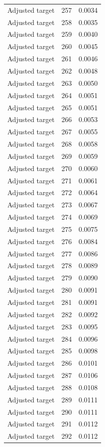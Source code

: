 \begin{table}[htbp]
\begin{tabular}{lll}
Adjusted target & 257 & 0.0034 \\
Adjusted target & 258 & 0.0035 \\
Adjusted target & 259 & 0.0040 \\
Adjusted target & 260 & 0.0045 \\
Adjusted target & 261 & 0.0046 \\
Adjusted target & 262 & 0.0048 \\
Adjusted target & 263 & 0.0050 \\
Adjusted target & 264 & 0.0051 \\
Adjusted target & 265 & 0.0051 \\
Adjusted target & 266 & 0.0053 \\
Adjusted target & 267 & 0.0055 \\
Adjusted target & 268 & 0.0058 \\
Adjusted target & 269 & 0.0059 \\
Adjusted target & 270 & 0.0060 \\
Adjusted target & 271 & 0.0061 \\
Adjusted target & 272 & 0.0064 \\
Adjusted target & 273 & 0.0067 \\
Adjusted target & 274 & 0.0069 \\
Adjusted target & 275 & 0.0075 \\
Adjusted target & 276 & 0.0084 \\
Adjusted target & 277 & 0.0086 \\
Adjusted target & 278 & 0.0089 \\
Adjusted target & 279 & 0.0090 \\
Adjusted target & 280 & 0.0091 \\
Adjusted target & 281 & 0.0091 \\
Adjusted target & 282 & 0.0092 \\
Adjusted target & 283 & 0.0095 \\
Adjusted target & 284 & 0.0096 \\
Adjusted target & 285 & 0.0098 \\
Adjusted target & 286 & 0.0101 \\
Adjusted target & 287 & 0.0106 \\
Adjusted target & 288 & 0.0108 \\
Adjusted target & 289 & 0.0111 \\
Adjusted target & 290 & 0.0111 \\
Adjusted target & 291 & 0.0112 \\
Adjusted target & 292 & 0.0112 \\

\end{tabular}
\end{table}
